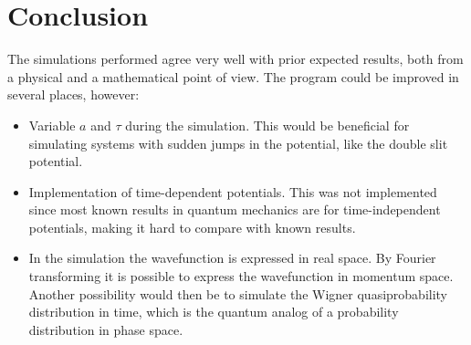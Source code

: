 \newpage
\section*{Conclusion}
The simulations performed agree very well with prior expected results, both from a physical and a mathematical point of view. The program could be improved in several places, however:

\begin{itemize}
\item Variable $a$ and $\tau$ during the simulation. This would be beneficial for simulating systems with sudden jumps in the potential, like the double slit potential.
\item Implementation of time-dependent potentials. This was not implemented since most known results in quantum mechanics are for time-independent potentials, making it hard to compare with known results.
\item In the simulation the wavefunction is expressed in real space. By Fourier transforming it is possible to express the wavefunction in momentum space. Another possibility would then be to simulate the Wigner quasiprobability distribution in time, which is the quantum analog of a probability distribution in phase space.
\end{itemize}
